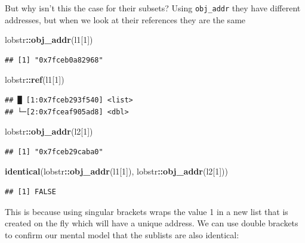 \documentclass[]{book}
\newenvironment{Shaded}{\begin{snugshade}}{\end{snugshade}}
\newcommand{\DecValTok}[1]{\textcolor[rgb]{0.00,0.00,0.81}{#1}}
\newcommand{\KeywordTok}[1]{\textcolor[rgb]{0.13,0.29,0.53}{\textbf{#1}}}
\newcommand{\NormalTok}[1]{#1}
\newcommand{\OperatorTok}[1]{\textcolor[rgb]{0.81,0.36,0.00}{\textbf{#1}}}
\begin{document}
But why isn't this the case for their subsets? Using \texttt{obj\_addr} they have different addresses, but when we look at their references they are the same

\begin{Shaded}
\begin{Highlighting}[]
\NormalTok{lobstr}\OperatorTok{::}\KeywordTok{obj_addr}\NormalTok{(l1[}\DecValTok{1}\NormalTok{])}
\end{Highlighting}
\end{Shaded}

\begin{verbatim}
## [1] "0x7fceb0a82968"
\end{verbatim}

\begin{Shaded}
\begin{Highlighting}[]
\NormalTok{lobstr}\OperatorTok{::}\KeywordTok{ref}\NormalTok{(l1[}\DecValTok{1}\NormalTok{])}
\end{Highlighting}
\end{Shaded}

\begin{verbatim}
## █ [1:0x7fceb293f540] <list> 
## └─[2:0x7fceaf905ad8] <dbl>
\end{verbatim}

\begin{Shaded}
\begin{Highlighting}[]
\NormalTok{lobstr}\OperatorTok{::}\KeywordTok{obj_addr}\NormalTok{(l2[}\DecValTok{1}\NormalTok{])}
\end{Highlighting}
\end{Shaded}

\begin{verbatim}
## [1] "0x7fceb29caba0"
\end{verbatim}

\begin{Shaded}
\begin{Highlighting}[]
\KeywordTok{identical}\NormalTok{(lobstr}\OperatorTok{::}\KeywordTok{obj_addr}\NormalTok{(l1[}\DecValTok{1}\NormalTok{]), lobstr}\OperatorTok{::}\KeywordTok{obj_addr}\NormalTok{(l2[}\DecValTok{1}\NormalTok{]))}
\end{Highlighting}
\end{Shaded}

\begin{verbatim}
## [1] FALSE
\end{verbatim}

This is because using singular brackets wraps the value 1 in a new list that is created on the fly which will have a unique address. We can use double brackets to confirm our mental model that the sublists are also identical:
\end{document}
